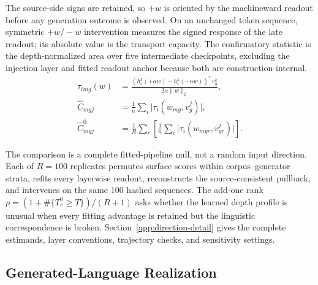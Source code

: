 The source-side signs are retained, so \(+w\) is oriented by the machineward readout before any generation outcome is observed. On an unchanged token sequence, symmetric \(+w/-w\) intervention measures the signed response of the late readout; its absolute value is the transport capacity. The confirmatory statistic is the depth-normalized area over five intermediate checkpoints, excluding the injection layer and fitted readout anchor because both are construction-internal.
\begin{equation}
\begin{aligned}
\tau_{img}(w)&=\frac{(h_i^k(+\alpha w)-h_i^k(-\alpha w))^\top v_g^k}{2\alpha\lVert w\rVert_2},\\
\widehat C_{mgj}&=\frac{1}{n}\sum_i\lvert\tau_i(w_{mg},v_g^j)\rvert,\\
\widehat C^0_{mgj}&=\frac{1}{R}\sum_r\left[\frac{1}{n}\sum_i\lvert\tau_i(w_{mgr},v_{gr}^j)\rvert\right].
\end{aligned}
\label{eq:transport-response}
\end{equation}

The comparison is a complete fitted-pipeline null, not a random input direction. Each of \(R=100\) replicates permutes surface scores within corpus--generator strata, refits every layerwise readout, reconstructs the source-consistent pullback, and intervenes on the same 100 hashed sequences. The add-one rank \(p=(1+\#\{T_r^0\geq T\})/(R+1)\) asks whether the learned depth profile is unusual when every fitting advantage is retained but the linguistic correspondence is broken. Section~\ref{app:direction-detail} gives the complete estimands, layer conventions, trajectory checks, and sensitivity settings.

\subsection{Generated-Language Realization}

